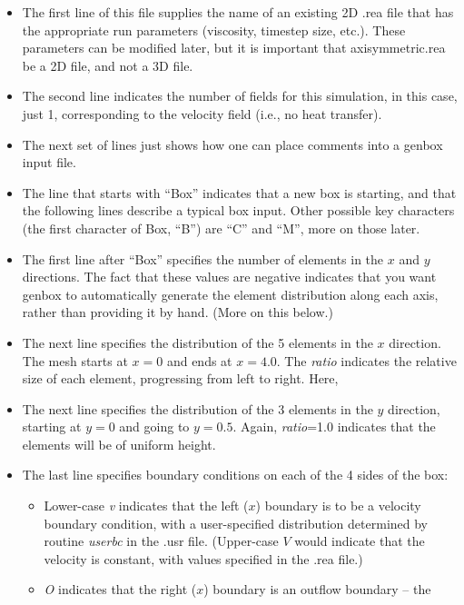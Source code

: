 \begin{itemize}
  \item
    The first line of this file supplies the name of an existing 2D .rea file
    that has the appropriate run parameters (viscosity, timestep size, etc.).
    These parameters can be modified later, but it is important that 
    axisymmetric.rea be a 2D file, and not a 3D file.
  \item
    The second line indicates the number of fields for this simulation, in
    this case, just 1, corresponding to the velocity field (i.e., no heat 
    transfer).
  \item
    The next set of lines just shows how one can place comments into a genbox
    input file.
  \item
    The line that starts with ``Box'' indicates that a new box is starting,
    and that the following lines describe a typical box input.  Other possible
    key characters (the first character of Box, ``B'') are ``C'' and ``M'',
    more on those later.
  \item
    The first line after ``Box'' specifies the number of elements in the
    \(x\) and \(y\) directions.   The fact that these values are negative indicates
    that you want genbox to automatically generate the element distribution 
    along each axis, rather than providing it by hand.  (More on this below.)
  \item
    The next line specifies the distribution of the 5 elements in the \(x\) direction.
    The mesh starts at \(x=0\) and ends at \(x=4.0\).  The {\em ratio} indicates the
    relative size of each element, progressing from left to right.  Here, 
  \item
    The next line specifies the distribution of the 3 elements in the \(y\) direction,
    starting at \(y=0\) and going to \(y=0.5\).  Again, 
    {\em ratio}=1.0 indicates that the elements will be of uniform height.
  \item
    The last line specifies boundary conditions on each of the 4 sides of the
    box:  
    \begin{itemize}
      \item
        Lower-case {\em v} indicates that the left (\(x\)) boundary is to be a velocity
        boundary condition, with a user-specified distribution determined by 
        routine {\em userbc} in the .usr file.  (Upper-case \(V\) would indicate that
        the velocity is constant, with values specified in the .rea file.)
      \item
        {\em O} indicates that the right (\(x\)) boundary is an outflow boundary -- the

\end{itemize}
\end{itemize}
